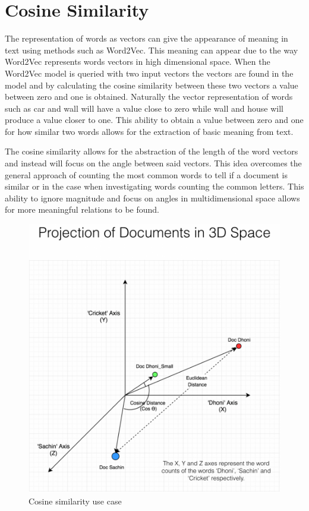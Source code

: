 \section{Cosine Similarity}
 The representation of words as vectors can give the appearance of meaning in text using methods such as Word2Vec. This meaning can appear due to the way Word2Vec represents words vectors in high dimensional space. When the Word2Vec model is queried with two input vectors the vectors are found in the model and by calculating the cosine similarity between these two vectors a value between zero and one is obtained. Naturally the vector representation of words such as car and wall will have a value close to zero while wall and house will produce a value closer to one. This ability to obtain a value between zero and one for how similar two words allows for the extraction of basic meaning from text. 
 
 The cosine similarity allows for the abstraction of the length of the word vectors and instead will focus on the angle between said vectors. This idea overcomes the general approach of counting the most common words to tell if a document is similar or in the case when investigating words counting the common letters. This ability to ignore magnitude and focus on angles in multidimensional space allows for more meaningful relations to be found.
 
 \begin{figure}[h]
    \centering
    \includegraphics[scale=0.1]{images/placeholder_vectors}
    \caption{Cosine similarity use case}
    \label{fig:cosine_vectors}
\end{figure}

